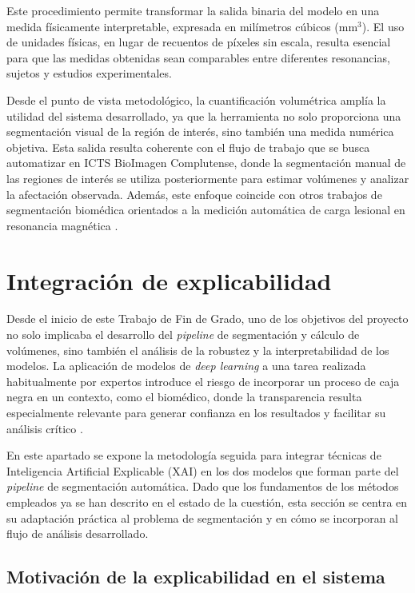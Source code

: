 Este procedimiento permite transformar la salida binaria del modelo en una medida físicamente interpretable, expresada en milímetros cúbicos (\(\text{mm}^3\)). El uso de unidades físicas, en lugar de recuentos de píxeles sin escala, resulta esencial para que las medidas obtenidas sean comparables entre diferentes resonancias, sujetos y estudios experimentales.

Desde el punto de vista metodológico, la cuantificación volumétrica amplía la utilidad del sistema desarrollado, ya que la herramienta no solo proporciona una segmentación visual de la región de interés, sino también una medida numérica objetiva. Esta salida resulta coherente con el flujo de trabajo que se busca automatizar en ICTS BioImagen Complutense, donde la segmentación manual de las regiones de interés se utiliza posteriormente para estimar volúmenes y analizar la afectación observada. Además, este enfoque coincide con otros trabajos de segmentación biomédica orientados a la medición automática de carga lesional en resonancia magnética \citep{Oliveira2022,Akkus2017}.

\section{Integración de explicabilidad}

Desde el inicio de este Trabajo de Fin de Grado, uno de los objetivos del proyecto no solo implicaba el desarrollo del \textit{pipeline} de segmentación y cálculo de volúmenes, sino también el análisis de la robustez y la interpretabilidad de los modelos. La aplicación de modelos de \textit{deep learning} a una tarea realizada habitualmente por expertos introduce el riesgo de incorporar un proceso de caja negra en un contexto, como el biomédico, donde la transparencia resulta especialmente relevante para generar confianza en los resultados y facilitar su análisis crítico \citep{samek2017explainableartificialintelligenceunderstanding,doshivelez2017rigorousscienceinterpretablemachine}.

En este apartado se expone la metodología seguida para integrar técnicas de Inteligencia Artificial Explicable (XAI) en los dos modelos que forman parte del \textit{pipeline} de segmentación automática. Dado que los fundamentos de los métodos empleados ya se han descrito en el estado de la cuestión, esta sección se centra en su adaptación práctica al problema de segmentación y en cómo se incorporan al flujo de análisis desarrollado.

\subsection{Motivación de la explicabilidad en el sistema}

